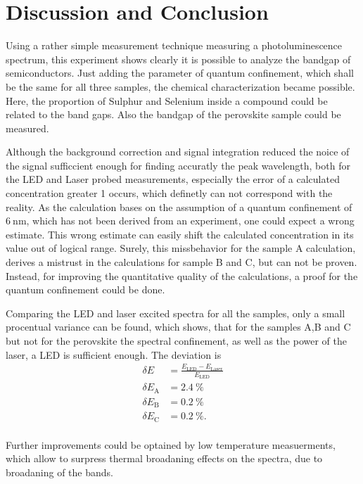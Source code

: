 \section{Discussion and Conclusion}
\label{sec:Discussion}


Using a rather simple measurement technique measuring a photoluminescence spectrum, this experiment shows clearly it is possible to analyze the bandgap of semiconductors.
Just adding the parameter of quantum confinement, which shall be the same for all three samples, the chemical characterization became possible.
Here, the proportion of Sulphur and Selenium inside a compound could be related to the band gaps. 
Also the bandgap of the perovskite sample could be measured.

Although the background correction and signal integration reduced the noice of the signal sufficcient enough for finding accuratly the peak wavelength, both for the LED and Laser probed measurements,
especially the error of a calculated concentration greater 1 occurs, which definetly can not correspond with the reality.
As the calculation bases on the assumption of a quantum confinement of $\SI{6}{\nano\meter}$, which has not been derived from an experiment, one could expect a wrong estimate.
This wrong estimate can easily shift the calculated concentration in its value out of logical range.
Surely, this missbehavior for the sample A calculation, derives a mistrust in the calculations for sample B and C, but can not be proven.
Instead, for improving the quantitative quality of the calculations, a proof for the quantum confinement could be done.

Comparing the LED and laser excited spectra for all the samples, only a small procentual variance can be found, which shows, that for the samples A,B and C but not for the perovskite the spectral confinement, as well as the power of the laser, a LED is sufficient enough.
The deviation is 
\begin{align*}
    \delta E &= \frac{E_\text{LED} - E_\text{Laser}}{E_\text{LED}} \\
    \delta E_\text{A} &= \SI{2.4}{\percent} \\
    \delta E_\text{B} &= \SI{0.2}{\percent} \\
    \delta E_\text{C} &= \SI{0.2}{\percent}. \\
\end{align*}

Further improvements could be optained by low temperature measuerments, which allow to surpress thermal broadaning effects on the spectra, due to broadaning of the bands.
